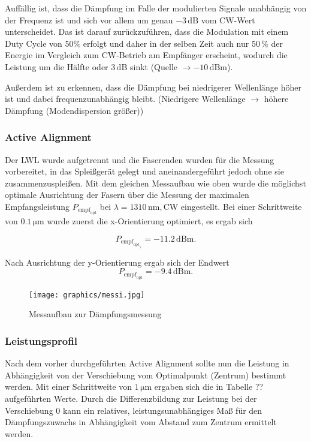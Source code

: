 Auffällig ist, dass die Dämpfung im Falle der modulierten Signale unabhängig von der Frequenz ist und sich vor allem um genau $-3 \, \si{\deci\bel}$ vom CW-Wert unterscheidet. Das ist darauf zurückzuführen, dass die Modulation mit einem Duty Cycle von $50 \si{\percent}$ erfolgt und daher in der selben Zeit auch nur $50\,\si{\percent}$ der Energie im Vergleich zum CW-Betrieb am Empfänger erscheint, wodurch die Leistung um die Hälfte oder $3 \, \si{\deci\bel}$ sinkt (Quelle $\rightarrow -10 \, \si{\deci\bel}\text{m}$).

Außerdem ist zu erkennen, dass die Dämpfung bei niedrigerer Wellenlänge höher ist und dabei frequenzunabhängig bleibt.
(Niedrigere Wellenlänge $\rightarrow$ höhere Dämpfung (Modendispersion größer))

\subsubsection{Active Alignment}
Der LWL wurde aufgetrennt und die Faserenden wurden für die Messung vorbereitet, in das Spleißgerät gelegt und aneinandergeführt jedoch ohne sie zusammenzuspleißen. Mit dem gleichen Messaufbau wie oben wurde die möglichst optimale Ausrichtung der Fasern über die Messung der maximalen Empfangsleistung $P_{\text{empf}_{\text{opt}}}$ bei $\lambda = 1310 \, \si{\nano\meter}, \text{CW}$ eingestellt. Bei einer Schrittweite von $0.1 \, \si{\micro\meter}$ wurde zuerst die x-Orientierung optimiert, es ergab sich

\[P_{\text{empf}_{\text{opt}_{x}}} = -11.2 \, \si{\deci\bel}\text{m}.\]

Nach Ausrichtung der y-Orientierung ergab sich der Endwert
\[P_{\text{empf}_{\text{opt}}} = -9.4 \, \si{\deci\bel}\text{m}.\]

\begin{figure}
\centering
\texttt{[image: graphics/messi.jpg]}
\caption{Messaufbau zur Dämpfungsmessung}
\end{figure}

\subsubsection{Leistungsprofil}
Nach dem vorher durchgeführten Active Alignment sollte nun die Leistung in Abhängigkeit von der Verschiebung vom Optimalpunkt (Zentrum) bestimmt werden. Mit einer Schrittweite von $1 \, \si{\micro\meter}$ ergaben sich die in Tabelle ?? aufgeführten Werte. Durch die Differenzbildung zur Leistung bei der Verschiebung $0$ kann ein relatives, leistungsunabhängiges Maß für den Dämpfungszuwachs in Abhängigkeit vom Abstand zum Zentrum ermittelt werden.

